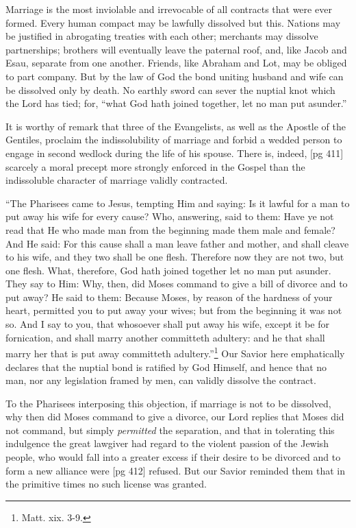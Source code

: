 Marriage is the most inviolable and irrevocable
of all contracts that were ever formed. Every
human compact may be lawfully dissolved but
this. Nations may be justified in abrogating
treaties with each other; merchants may dissolve
partnerships; brothers will eventually leave the
paternal roof, and, like Jacob and Esau, separate
from one another. Friends, like Abraham and
Lot, may be obliged to part company. But by the
law of God the bond uniting husband and wife
can be dissolved only by death. No earthly sword
can sever the nuptial knot which the Lord has
tied; for, “what God hath joined together, let no
man put asunder.”

It is worthy of remark that three of the Evangelists,
as well as the Apostle of the Gentiles, proclaim
the indissolubility of marriage and forbid
a wedded person to engage in second wedlock
during the life of his spouse. There is, indeed,
[pg 411]
scarcely a moral precept more strongly enforced
in the Gospel than the indissoluble character of
marriage validly contracted.

“The Pharisees came to Jesus, tempting Him
and saying: Is it lawful for a man to put
away his wife for every cause? Who, answering,
said to them: Have ye not read that He who
made man from the beginning made them male
and female? And He said: For this cause shall
a man leave father and mother, and shall cleave
to his wife, and they two shall be one flesh.
Therefore now they are not two, but one flesh.
What, therefore, God hath joined together let no
man put asunder. They say to Him: Why, then,
did Moses command to give a bill of divorce and
to put away? He said to them: Because Moses,
by reason of the hardness of your heart, permitted
you to put away your wives; but from the
beginning it was not so. And I say to you, that
whosoever shall put away his wife, except it be for
fornication, and shall marry another committeth
adultery: and he that shall marry her that is
put away committeth adultery.”\footnote{Matt.
xix. 3-9.} Our Savior here
emphatically declares that the nuptial bond is
ratified by God Himself, and hence that no man,
nor any legislation framed by men, can validly
dissolve the contract.

To the Pharisees interposing this objection, if
marriage is not to be dissolved, why then did
Moses command to give a divorce, our Lord replies
that Moses did not command, but simply
\emph{permitted} the separation, and that in tolerating
this indulgence the great lawgiver had regard to
the violent passion of the Jewish people, who
would fall into a greater excess if their desire
to be divorced and to form a new alliance were
[pg 412]
refused. But our Savior reminded them that in
the primitive times no such license was granted.

